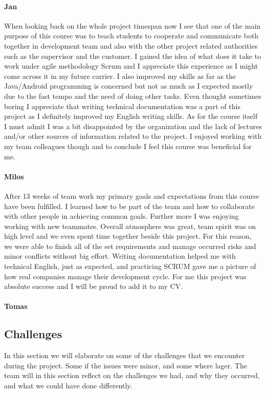 \paragraph{Jan}
When looking back on the whole project timespan now I see that one of the main purpose of this course was to teach students to cooperate and communicate both together in development team and also with the other project related authorities such as the supervisor and the customer. I gained the idea of what does it take to work under agile methodology Scrum and I appreciate this experience as I might come across it in my future carrier. I also improved my skills as far as the Java/Android programming is concerned but not as much as I expected mostly due to the fast tempo and the need of doing other tasks. Even thought sometimes boring I appreciate that writing technical documentation was a part of this project as I definitely improved my English writing skills. As for the course itself I must admit I was a bit disappointed by the organization and the lack of lectures and/or other sources of information related to the project. I enjoyed working with my team colleagues though and to conclude I feel this course was beneficial for me.

\paragraph{Milos}
After 13 weeks of team work my primary goals and expectations from this course have been fulfilled. I learned how to be part of the team and how to collaborate with other people in achieving common goals. Further more I was enjoying working with new teammates. Overall atmosphere was great, team spirit was on high level and we even spent time together beside this project. For this reason, we were able to finish all of the set requirements and manage occurred risks and minor conflicts without big effort. Writing documentation helped me with technical English, just as expected, and practicing SCRUM gave me a picture of how real companies manage their development cycle. For me this project was absolute success and I will be proud to add it to my CV.

\paragraph{Tomas}

\subsection{Challenges}
In this section we will elaborate on some of the challenges that we encounter during the project. Some if the issues were minor, and some where lager. The team will in this section reflect on the challenges we had, and why they occurred, and what we could have done differently.

